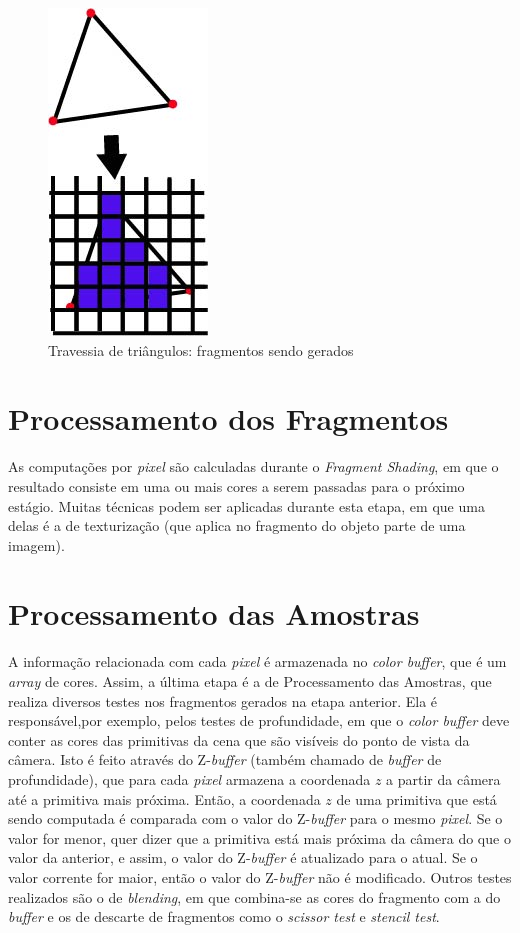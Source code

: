 \begin{anexosenv}
  \begin{figure}[ht]
       \centering
	\includegraphics[keepaspectratio=true,scale=0.8]{figuras/traversal.jpg}
       \caption{Travessia de triângulos: fragmentos sendo gerados}
       \label{traversal}
       \end{figure}

\section{Processamento dos Fragmentos}

	As computações por \textit{pixel} são calculadas durante o \textit{Fragment Shading}, em que o resultado consiste em uma ou mais cores a serem passadas para o próximo estágio. Muitas técnicas podem ser aplicadas durante esta etapa, em que uma delas é a de texturização (que aplica no fragmento do objeto parte de uma imagem). 

\section{Processamento das Amostras}

	 A informação relacionada com cada \textit{pixel} é armazenada no \textit{color buffer}, que é um \textit{array} de cores. Assim, a última etapa é a de Processamento das Amostras, que realiza diversos testes nos fragmentos gerados na etapa anterior. Ela é responsável,por exemplo, pelos testes de profundidade, em que o \textit{color buffer} deve conter as cores das primitivas da cena que são visíveis do ponto de vista da câmera. Isto é feito através do Z-\textit{buffer} (também chamado de \textit{buffer} de profundidade), que para cada \textit{pixel} armazena a coordenada $z$ a partir da câmera até a primitiva mais próxima.  Então, a coordenada $z$ de uma primitiva que está sendo computada é comparada com  o valor do Z-\textit{buffer} para o mesmo \textit{pixel}. Se o valor for menor, quer dizer que a primitiva está mais próxima da câmera do que o valor da anterior, e assim, o valor do Z-\textit{buffer} é atualizado para o atual. Se o valor corrente for maior, então o valor do Z-\textit{buffer} não é modificado. Outros testes realizados são o de \textit{blending}, em que combina-se as cores do fragmento com a do \textit{buffer} e os de descarte de fragmentos como o \textit{scissor test} e \textit{stencil test}. 	


\end{anexosenv}
